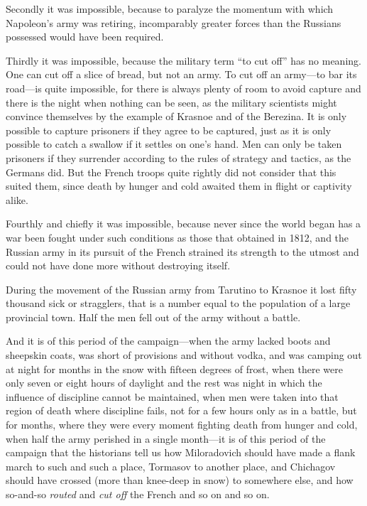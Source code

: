 Secondly it was impossible, because to paralyze the momentum with
which Napoleon's army was retiring, incomparably greater forces
than the Russians possessed would have been required.

Thirdly it was impossible, because the military term ``to cut
off'' has no meaning. One can cut off a slice of bread, but not
an army. To cut off an army---to bar its road---is quite
impossible, for there is always plenty of room to avoid capture
and there is the night when nothing can be seen, as the military
scientists might convince themselves by the example of Krasnoe
and of the Berezina. It is only possible to capture prisoners if
they agree to be captured, just as it is only possible to catch a
swallow if it settles on one's hand. Men can only be taken
prisoners if they surrender according to the rules of strategy
and tactics, as the Germans did. But the French troops quite
rightly did not consider that this suited them, since death by
hunger and cold awaited them in flight or captivity alike.

Fourthly and chiefly it was impossible, because never since the
world began has a war been fought under such conditions as those
that obtained in 1812, and the Russian army in its pursuit of the
French strained its strength to the utmost and could not have
done more without destroying itself.

During the movement of the Russian army from Tarutino to Krasnoe
it lost fifty thousand sick or stragglers, that is a number equal
to the population of a large provincial town. Half the men fell
out of the army without a battle.

And it is of this period of the campaign---when the army lacked
boots and sheepskin coats, was short of provisions and without
vodka, and was camping out at night for months in the snow with
fifteen degrees of frost, when there were only seven or eight
hours of daylight and the rest was night in which the influence
of discipline cannot be maintained, when men were taken into that
region of death where discipline fails, not for a few hours only
as in a battle, but for months, where they were every moment
fighting death from hunger and cold, when half the army perished
in a single month---it is of this period of the campaign that the
historians tell us how Miloradovich should have made a flank
march to such and such a place, Tormasov to another place, and
Chichagov should have crossed (more than knee-deep in snow) to
somewhere else, and how so-and-so \emph{routed} and \emph{cut
off} the French and so on and so on.

